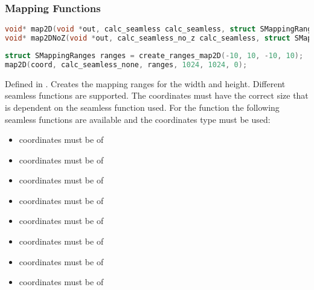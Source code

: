 \subsubsection{Mapping Functions}

\begin{lstlisting}[caption={Definition of mapping functions},label={lst:mapping_definition},language=OpenCL]
void* map2D(void *out, calc_seamless calc_seamless, struct SMappingRanges ranges, size_t width, size_t height, REAL z);
void* map2DNoZ(void *out, calc_seamless_no_z calc_seamless, struct SMappingRanges ranges, size_t width, size_t height);
\end{lstlisting}

\begin{lstlisting}[caption={Example for mapping functions},label={lst:mapping_example},language=OpenCL]
struct SMappingRanges ranges = create_ranges_map2D(-10, 10, -10, 10);
map2D(coord, calc_seamless_none, ranges, 1024, 1024, 0);
\end{lstlisting}

Defined in .
Creates the mapping ranges for the width and height. Different seamless functions are supported.
The coordinates must have the correct size that is dependent on the seamless function used.
For the  function the following seamless functions are available and the
coordinates type must be used:

\begin{itemize}
\item {} coordinates must be of 
\item {} coordinates must be of 
\item {} coordinates must be of 
\item {} coordinates must be of 
\item {} coordinates must be of 
\item {} coordinates must be of 
\item {} coordinates must be of 
\item {} coordinates must be of 
\end{itemize}

